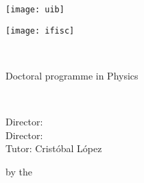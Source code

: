 \documentclass[../thesis.tex]{subfiles}
\begin{document}
\begin{titlepage}
    \begin{addmargin}[-1cm]{-3cm}
        \large

        \hfill
        \begin{minipage}[c][0.2\textheight]{0.5\textwidth}
            \texttt{[image: uib]}
        \end{minipage}
        \hfill
        \begin{minipage}[c][0.2\textheight]{0.5\textwidth}
            \texttt{[image: ifisc]}
        \end{minipage}
        \hfill

        \begin{center}
            \vspace*{.1\textheight}
        
             \\
            \myYear
        
            \bigskip

            Doctoral programme in Physics \\

            \vfill
        
            \begingroup
                \color{CTtitle}
                \spacedallcaps{\myTitle}
                \\ \smallskip
                \emph{\mySubtitle}
            \endgroup

            \bigskip
            
            \spacedlowsmallcaps{\myName}
            
            \vfill

            \begin{flushleft}
                Director: \mySupervisor \\
                Director: \myOtherSupervisor \\
                Tutor: Cristóbal López \\

                \vfill

                \myDegree by the \myUni
            \end{flushleft}
        
        \end{center}
    \end{addmargin}
\end{titlepage}
\end{document}
